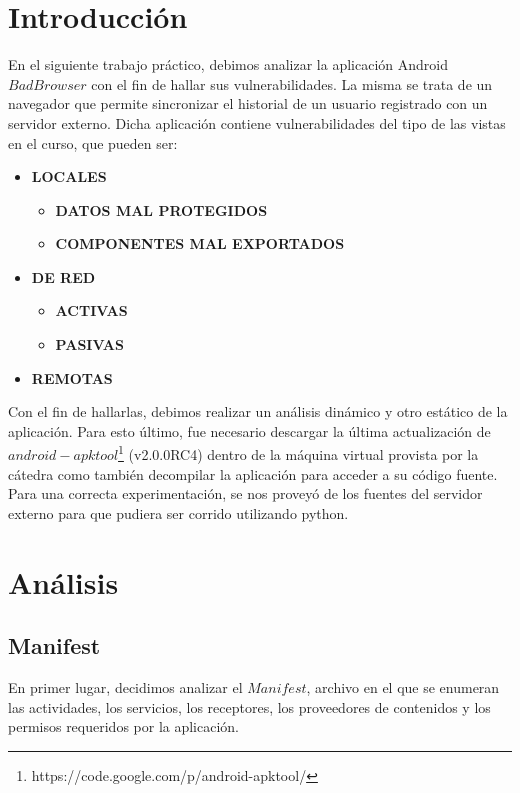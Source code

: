\documentclass[10pt, a4paper]{article}
\begin{document}
\section{Introducción}
En el siguiente trabajo práctico, debimos analizar la aplicación Android $BadBrowser$ con el fin de hallar sus vulnerabilidades. La misma se trata de un navegador que permite sincronizar el historial de un usuario registrado con un servidor externo. Dicha aplicación contiene vulnerabilidades del tipo de las vistas en el curso, que pueden ser:
\begin{itemize}
\item \textbf{LOCALES}
\begin{itemize}
\item \textbf{DATOS MAL PROTEGIDOS}
\item \textbf{COMPONENTES MAL EXPORTADOS}
\end{itemize}
\item \textbf{DE RED}
\begin{itemize}
\item \textbf{ACTIVAS}
\item \textbf{PASIVAS}
\end{itemize}
\item \textbf{REMOTAS}
\end{itemize}

Con el fin de hallarlas, debimos realizar un análisis dinámico y otro estático de la aplicación. Para esto último, fue necesario descargar la última actualización de $android-apktool$\footnote{https://code.google.com/p/android-apktool/} (v2.0.0RC4) dentro de la máquina virtual provista por la cátedra como también decompilar la aplicación para acceder a su código fuente.
Para una correcta experimentación, se nos proveyó de los fuentes del servidor externo para que pudiera ser corrido utilizando python.

\newpage
\section{Análisis}

\subsection{Manifest}

En primer lugar, decidimos analizar el $Manifest$, archivo en el que se enumeran las actividades, los servicios, los receptores, los proveedores de contenidos y los permisos requeridos por la aplicación. 
\end{document}
